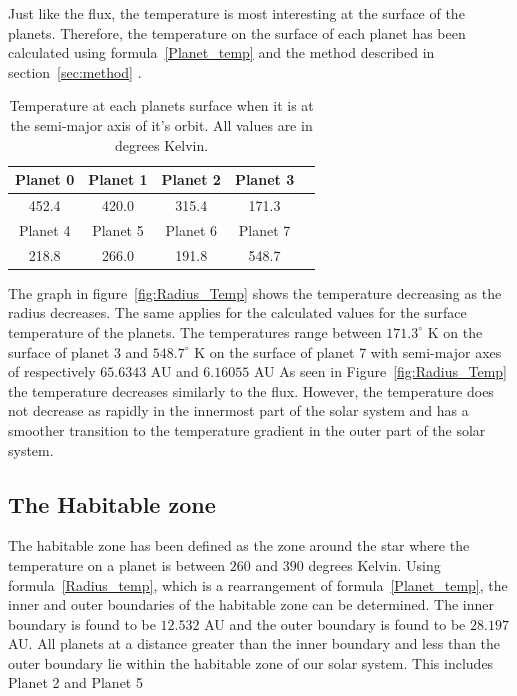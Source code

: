 \documentclass[reprint,english,notitlepage]{revtex4-2}
\begin{document}
	Just like the flux, the temperature is most interesting at the surface of the planets.
	Therefore, the temperature on the surface of each planet has been calculated using formula~\eqref{Planet_temp} and the method described in section~\ref{sec:method} .

	\begin{table}[h]
			\begin{tabular}{|c|c|c|c|c|}
				\hline
				Planet 0 & Planet 1 & Planet 2 & Planet 3\\
				\hline
				452.4 & 420.0 & 315.4 & 171.3\\
				\hline\hline
				Planet 4 & Planet 5 & Planet 6 & Planet 7\\
				\hline
				218.8 & 266.0 & 191.8 & 548.7\\
				\hline
			\end{tabular}
			\caption{Temperature at each planets surface when it is at the semi-major axis of it's orbit. All values are in degrees Kelvin.}
			\label{tab:planet_temp}
		\end{table}

	The graph in figure~\ref{fig:Radius_Temp} shows the temperature decreasing as the radius decreases.
	The same applies for the calculated values for the surface temperature of the planets.
	The temperatures range between $171.3^{\circ}$ K on the surface of planet 3 and $548.7^{\circ}$ K on the surface of planet 7 with semi-major axes of respectively $65.6343$ AU and $6.16055$ AU
	As seen in Figure~\ref{fig:Radius_Temp} the temperature decreases similarly to the flux.
	However, the temperature does not decrease as rapidly in the innermost part of the solar system and has a smoother transition to the temperature gradient in the outer part of the solar system.\\


\subsection{The Habitable zone}\label{subsec:the-habitable-zone-results}
	The habitable zone has been defined as the zone around the star where the temperature on a planet is between $260$ and $390$ degrees Kelvin.
	Using formula~\eqref{Radius_temp}, which is a rearrangement of formula~\eqref{Planet_temp}, the inner and outer boundaries of the habitable zone can be determined.
	The inner boundary is found to be $12.532$ AU and the outer boundary is found to be $28.197$ AU.
	All planets at a distance greater than the inner boundary and less than the outer boundary lie within the habitable zone of our solar system.
	This includes Planet 2 and Planet 5\\
\end{document}
